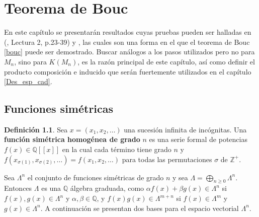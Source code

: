 \documentclass[12pt]{book}
\theoremstyle{definition}
\newtheorem{definition}[theorem]{Definición}
\newcounter{in}
\newcounter{ini}
\begin{document}
\chapter{Teorema de Bouc}
\label{summ}
En este capítulo se presentarán resultados cuyas pruebas pueden ser
halladas en \normalfont(\cite{wachs2006poset}, Lectura 2, p.23-39) y
\cite{macdonald1998symmetric}, las cuales son una forma
en el que el teorema de Bouc \ref{bouc} puede ser demostrado. Buscar
análogos a los pasos utilizados pero no para $M_{n}$, sino para
$K(M_{n})$, es la razón principal de este capítulo, así como definir el
producto composición e inducido que serán fuertemente utilizados en el capítulo \ref{Des_esp_cad}.

\section{Funciones simétricas}
\label{sim_fun}
\begin{definition}
Sea $x = (x_1, x_2, \ldots)$ una sucesión infinita de incógnitas. Una
\textbf{función simétrica homogénea de grado} $n$ es una serie formal de potencias
$f(x) \in \mathbb{Q}\left [ \left [ x \right ] \right ]$ en la cual
cada término tiene grado $n$ y
$f(x_{\sigma(1)},x_{\sigma(2)}, \ldots) = f(x_1, x_2, \ldots)$ para
todas las permutaciones $\sigma$ de $\mathbb{Z}^{+}$.
\end{definition}
Sea $\Lambda^{n}$ el conjunto de funciones simétricas de grado $n$ y
sea $\Lambda = \bigoplus_{n \geq 0} \Lambda^{n}$. Entonces $\Lambda$
es una $\mathbb{Q}$ álgebra graduada, como
$\alpha f(x) + \beta g(x) \in \Lambda^{n}$ si
$f(x), g(x) \in \Lambda^{n}$ y $\alpha, \beta \in \mathbb{Q}$, y
$f(x)g(x) \in \Lambda^{m+n}$ si $f(x) \in \Lambda^{m}$ y
$g(x) \in \Lambda^{n}$.
A continuación se presentan dos bases para el espacio vectorial
$\Lambda^{n}$.  
\end{document}

